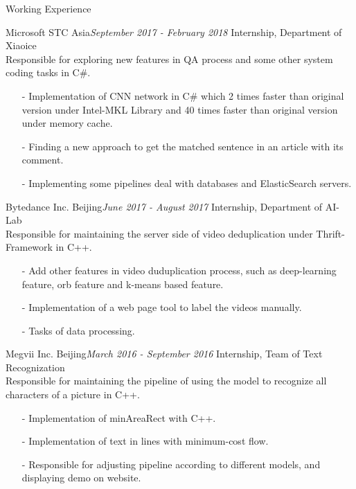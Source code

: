 \documentclass{resume} %
\begin{document}
\begin{rSection}{Working Experience}

\begin{rSubsection}{Microsoft STC Asia}{\em September 2017 - February 2018}
{Internship, Department of Xiaoice \\}
{Responsible for exploring new features in QA process and some other system coding tasks in C\#.}
\item[]
\begin{itemize}
\setlength\itemsep{-0.5em}
\item[-] Implementation of CNN network in C\# which 2 times faster than original version under Intel-MKL Library and 40 times faster than original version under memory cache.
\item[-] Finding a new approach to get the matched sentence in an article with its comment.
\item[-] Implementing some pipelines deal with databases and ElasticSearch servers.
\end{itemize}
\end{rSubsection}


\begin{rSubsection}{Bytedance Inc. Beijing}{\em June 2017 - August 2017}
{Internship, Department of AI-Lab \\}
{Responsible for maintaining the server side of video deduplication under Thrift-Framework in C++.}
\item[]
\begin{itemize}
\setlength\itemsep{-0.5em}
\item[-] Add other features in video duduplication process, such as deep-learning feature, orb feature and k-means based feature.
\item[-] Implementation of a web page tool to label the videos manually.
\item[-] Tasks of data processing.
\end{itemize}
\end{rSubsection}


\begin{rSubsection}{Megvii Inc. Beijing}{\em March 2016 - September 2016}
{Internship, Team of Text Recognization \\}
{Responsible for maintaining the pipeline of using the model to recognize all characters of a picture in C++.}
\item[]
\begin{itemize}
\setlength\itemsep{-0.5em}
\item[-] Implementation of minAreaRect with C++.
\item[-] Implementation of text in lines with minimum-cost flow.
\item[-] Responsible for adjusting pipeline according to different models, and displaying demo on website.
\end{itemize}
\end{rSubsection}

\end{rSection}
\end{document}

